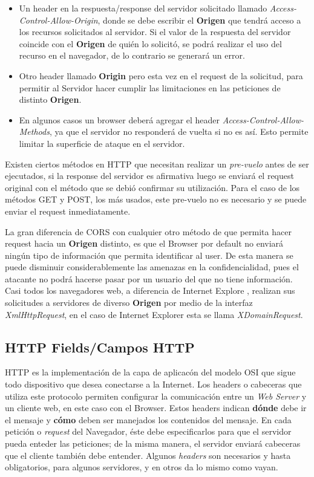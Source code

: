         \begin{itemize}
            \item Un header en la respuesta/response del servidor solicitado llamado \textit{Access-Control-Allow-Origin}, donde se debe escribir el \textbf{Origen} que tendrá acceso a los recursos solicitados al servidor. Si el valor de la respuesta del servidor coincide con el \textbf{Origen} de quién lo solicitó, se podrá realizar el uso del recurso en el navegador, de lo contrario se generará un error.

            \item Otro header llamado \textbf{Origin} pero esta vez en el request de la solicitud, para permitir al Servidor hacer cumplir las limitaciones en las peticiones de distinto \textbf{Origen}.

            \item En algunos casos un browser deberá agregar el header \textit{Access-Control-Allow-Methods}, ya que el servidor no responderá de vuelta si no es así. Esto permite limitar la superficie de ataque en el servidor.

        \end{itemize}
    Existen ciertos métodos en HTTP que necesitan realizar un \textit{pre-vuelo} antes de ser ejecutados, si la response del servidor es afirmativa luego se enviará el request original con el método que se debió confirmar su utilización. Para el caso de los métodos GET y POST, los más usados, este pre-vuelo no es necesario y se puede enviar el request inmediatamente.
    
    La gran diferencia de CORS con cualquier otro método de que permita hacer request hacia un \textbf{Origen} distinto, es que el Browser por default no enviará ningún tipo de información que permita identificar al user. De esta manera se puede disminuir considerablemente las amenazas en la confidencialidad, pues el atacante no podrá hacerse pasar por un usuario del que no tiene información. Casi todos los navegadores web, a diferencia de Internet Explore \cite{bookWebAppSec}, realizan sus solicitudes a servidores de diverso \textbf{Origen} por medio de la interfaz \textit{XmlHttpRequest}, en el caso de Internet Explorer esta se llama \textit{XDomainRequest}.

\subsection{HTTP Fields/Campos HTTP}
    \label{chap2:headers}
    HTTP es la implementación de la capa de aplicacón del modelo OSI que sigue todo dispositivo que desea conectarse a la Internet. Los headers o cabeceras que utiliza este protocolo permiten configurar la comunicación entre un \textit{Web Server} y un cliente web, en este caso con el Browser. Estos headers indican \textbf{dónde} debe ir el mensaje y \textbf{cómo} deben ser manejados los contenidos del mensaje. En cada petición o \textit{request} del Navegador, éste debe especificarlos para que el servidor pueda enteder las peticiones; de la misma manera, el servidor enviará cabeceras que el cliente también debe entender. Algunos \textit{headers} son necesarios y hasta obligatorios, para algunos servidores, y en otros da lo mismo como vayan.


